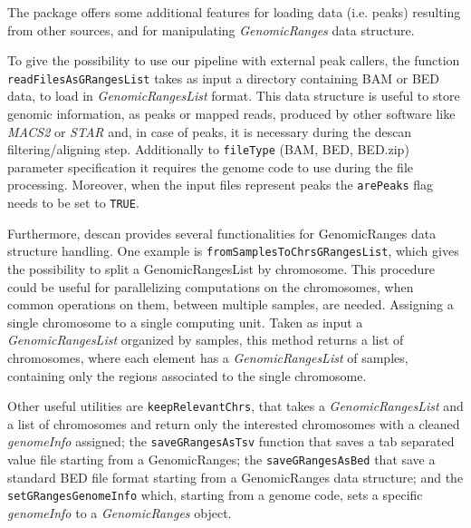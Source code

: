 The package offers some additional features for loading data (i.e. peaks) resulting from other sources, and for manipulating \textit{GenomicRanges} data structure.

To give the possibility to use our pipeline with external peak callers, the function \lstinline!readFilesAsGRangesList! takes as input a directory containing BAM or BED data, to load in \textit{GenomicRangesList} format.
This data structure is useful to store genomic information, as peaks or mapped reads, produced by other software like \textit{MACS2} or \textit{STAR} and, in case of peaks, it is necessary during the \gls{descan} filtering/aligning step.
Additionally to \lstinline!fileType! (BAM, BED, BED.zip) parameter specification it requires the genome code to use during the file processing.
Moreover, when the input files represent peaks the \lstinline!arePeaks! flag needs to be set to \lstinline!TRUE!.

Furthermore, \gls{descan} provides several functionalities for GenomicRanges data structure
handling. One example is \lstinline!fromSamplesToChrsGRangesList!, which gives the possibility to split a GenomicRangesList by  chromosome. 
This procedure could be useful for parallelizing computations on the chromosomes, when common operations on them, between multiple samples, are needed. Assigning a single chromosome to a single computing unit.
Taken as input a \textit{GenomicRangesList} organized by samples, this method returns a list of chromosomes, where each element has a \textit{GenomicRangesList} of samples, containing only the regions associated to the single chromosome.


Other useful utilities are \lstinline!keepRelevantChrs!, that takes a \textit{GenomicRangesList} and a list of chromosomes and return only the interested chromosomes with a cleaned \textit{genomeInfo} assigned;
the \lstinline!saveGRangesAsTsv! function that saves a tab separated value file starting from a GenomicRanges; the 
\lstinline!saveGRangesAsBed! that save a standard BED file format starting from a GenomicRanges data structure; and the \lstinline!setGRangesGenomeInfo! which, starting from a genome code, sets a specific \textit{genomeInfo} to a \textit{GenomicRanges} object.